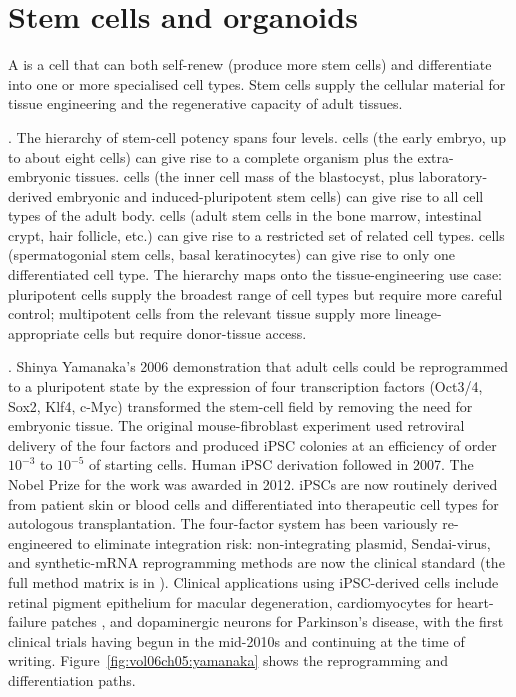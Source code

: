 \section{Stem cells and organoids}

A  is a cell that can both self-renew (produce
more stem cells) and differentiate into one or more specialised cell
types. Stem cells supply the cellular material for tissue engineering
and the regenerative capacity of adult tissues.

. The hierarchy of stem-cell potency
spans four levels.  cells (the early embryo, up
to about eight cells) can give rise to a complete organism plus the
extra-embryonic tissues.  cells (the inner cell
mass of the blastocyst, plus laboratory-derived embryonic and
induced-pluripotent stem cells) can give rise to all cell types of
the adult body.  cells (adult stem cells in the
bone marrow, intestinal crypt, hair follicle, etc.) can give rise to
a restricted set of related cell types.  cells
(spermatogonial stem cells, basal keratinocytes) can give rise to
only one differentiated cell type. The hierarchy maps onto the
tissue-engineering use case: pluripotent cells supply the broadest
range of cell types but require more careful control; multipotent
cells from the relevant tissue supply more lineage-appropriate cells
but require donor-tissue access.

. Shinya Yamanaka's
2006 demonstration \cite{paper:v6c05-yamanaka-2006} that adult cells
could be reprogrammed to a pluripotent state by the expression of
four transcription factors (Oct3/4, Sox2, Klf4, c-Myc) transformed
the stem-cell field by removing the need for embryonic tissue. The
original mouse-fibroblast experiment used retroviral delivery of the
four factors and produced iPSC colonies at an efficiency of order
$10^{-3}$ to $10^{-5}$ of starting cells. Human iPSC derivation
followed in 2007. The Nobel Prize for the work was awarded in 2012.
iPSCs are now routinely derived from patient skin or blood cells and
differentiated into therapeutic cell types for autologous
transplantation. The four-factor system has been variously
re-engineered to eliminate integration risk: non-integrating
plasmid, Sendai-virus, and synthetic-mRNA reprogramming methods are
now the clinical standard (the full method matrix is in
). Clinical applications
using iPSC-derived cells include retinal pigment epithelium for
macular degeneration, cardiomyocytes for heart-failure patches
\cite{paper:v6c05-laflamme-cardiomyocyte-2007}, and dopaminergic
neurons for Parkinson's disease, with the first clinical trials
having begun in the mid-2010s and continuing at the time of writing.
Figure~\ref{fig:vol06ch05:yamanaka} shows the reprogramming and
differentiation paths.

